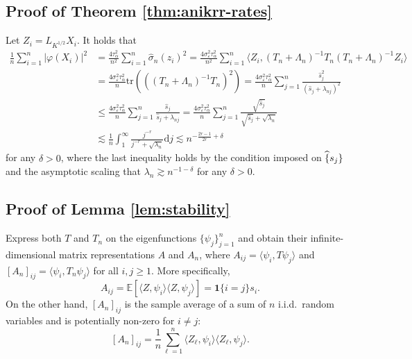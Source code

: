 \documentclass[11pt,a4paper]{article}
\renewcommand{\hat}{\widehat}
\newcommand{\vct}{\boldsymbol}
\newcommand{\tr}{\mathrm{tr}}
\theoremstyle{definition}
\theoremstyle{plain}
\theoremstyle{remark}
\newcommand{\ud}{\mathrm d}
\begin{document}
\subsection{Proof of Theorem \ref{thm:anikrr-rates}}

Let $Z_i=L_{K^{1/2}}X_i$.
It holds that
\begin{align*}
\frac{1}{n}\sum_{i=1}^n\big|\varphi(X_i)\big|^2 &= \frac{4\tau_\alpha^2}{n^2}\sum_{i=1}^n\hat\sigma_n(z_i)^2 = \frac{4\sigma_\varepsilon^2\tau_\alpha^2}{n^2}\sum_{i=1}^n \langle Z_i, (T_n+\Lambda_n)^{-1}T_n(T_n+\Lambda_n)^{-1}Z_i\rangle\\
&= \frac{4\sigma_\varepsilon^2\tau_\alpha^2}{n}\tr(((T_n+\Lambda_n)^{-1}T_n)^2) = \frac{4\sigma_\varepsilon^2\tau_\alpha^2}{n}\sum_{j=1}^n\frac{\hat s_j^2}{(\hat s_j+\lambda_{nj})^2}\\
&\leq \frac{4\sigma_\varepsilon^2\tau_\alpha^2}{n}\sum_{j=1}^n\frac{\hat s_j}{\hat s_j+\lambda_{nj}} = \frac{4\sigma_\varepsilon^2\tau_\alpha^2}{n}\sum_{j=1}^n\frac{\sqrt{\hat s_j}}{\sqrt{\hat s_j}+\sqrt{\lambda_{n}}}\\
&\lesssim \frac{1}{n}\int_1^{\infty} \frac{j^{-r}}{j^{-r}+\sqrt{\lambda_n}}\ud j \lesssim n^{-\frac{2r-1}{2r}+\delta}
\end{align*}
for any $\delta>0$, where the last inequality holds by the condition imposed on $\hat\{s_j\}$ and the asymptotic scaling that $\lambda_n\gtrsim n^{-1-\delta}$ for any $\delta>0$.


\subsection{Proof of Lemma \ref{lem:stability}}

Express both $T$ and $T_n$ on the eigenfunctions $\{\psi_j\}_{j=1}^n$ and obtain their infinite-dimensional matrix representations $A$ and $A_n$,
where $A_{ij}=\langle \psi_i,T\psi_j\rangle$ and $[A_n]_{ij}=\langle\psi_i, T_n\psi_j\rangle$ for all $i,j\geq 1$.
More specifically,
$$
A_{ij} = \mathbb E[\langle Z,\psi_i\rangle\langle Z,\psi_j\rangle] = \vct 1\{i=j\}s_i.
$$
On the other hand, $[A_n]_{ij}$ is the sample average of a sum of $n$ i.i.d.~random variables and is potentially non-zero for $i\neq j$:
$$
[A_n]_{ij} = \frac{1}{n}\sum_{\ell=1}^n \langle Z_\ell,\psi_i\rangle\langle Z_\ell,\psi_j\rangle.
$$

\end{document}
